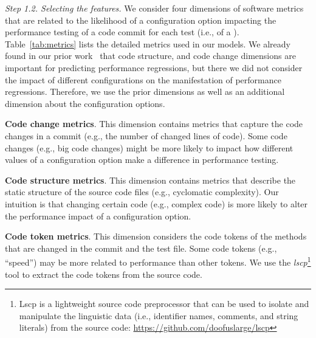 \begin{comment}
\end{comment}

\textit{Step 1.2. Selecting the features.}
We consider four dimensions of software metrics that are related to the likelihood of a configuration option impacting the performance testing of a code commit for each test (i.e., of a \instance). Table~\ref{tab:metrics} lists the detailed metrics used in our models. %
We already found in our prior work~\cite{jinfu_tse2020} that code structure, and code change dimensions are important for predicting performance regressions, but there we did not consider the impact of different configurations on the manifestation of performance regressions. Therefore, we use the prior dimensions as well as an additional dimension about the configuration options.

    \textbf{Code change metrics}. This dimension contains metrics that capture the code changes in a commit (e.g., the number of changed lines of code). Some code changes (e.g., big code changes) might be more likely to impact how different values of a configuration option make a difference in performance testing.
    
    \textbf{Code structure metrics}. This dimension contains metrics that describe the static structure of the source code files (e.g., cyclomatic complexity). %
    Our intuition is that changing certain code (e.g., complex code) is more likely to alter the performance impact of a configuration option.
    
    \textbf{Code token metrics}. This dimension considers the code tokens of the methods that are changed in the commit and the test file. %
    Some code tokens (e.g., ``speed'') may be more related to performance than other tokens. We use the \emph{lscp}\footnote{Lscp is a lightweight source code preprocessor that can be used to isolate and manipulate the linguistic data (i.e., identifier names, comments, and string literals) from the source code: \url{https://github.com/doofuslarge/lscp}} tool to extract the code tokens from the source code. 
    
